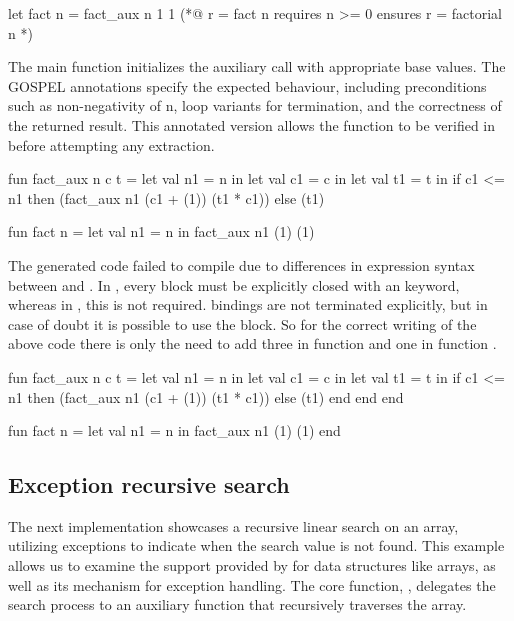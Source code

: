 \begin{gospell}
let fact n = fact_aux n 1 1
(*@ 
  r = fact n
  requires n >= 0 
  ensures r = factorial n
*)
\end{gospell}

The main function  initializes the auxiliary call with appropriate base values. The GOSPEL annotations 
specify the expected behaviour, including preconditions such as non-negativity of n, loop variants for termination, and the 
correctness of the returned result. This annotated version allows the function to be verified in \whythree before attempting any 
extraction.

\begin{cakeml}
fun fact_aux n c t = let val n1 = n in
  let val c1 = c in
  let val t1 = t in
  if c1 <= n1 then (fact_aux n1 (c1 + (1)) (t1 * c1))  else (t1)

fun fact n = let val n1 = n in fact_aux n1 (1) (1)
\end{cakeml}

The generated \cml code failed to compile due to differences in  expression syntax between \ocaml and \cml. In \cml, every 
 block must be explicitly closed with an  keyword, whereas in \ocaml, this is not required. 
 bindings are not terminated explicitly, but in case of doubt it is possible to use the  block. 
So for the correct writing of the above code there is only the need to add three  in function  and 
one  in function .

\begin{cakeml}
fun fact_aux n c t = let val n1 = n in
  let val c1 = c in
  let val t1 = t in
  if c1 <= n1 then (fact_aux n1 (c1 + (1)) (t1 * c1))  else (t1)
  end end end

fun fact n = let val n1 = n in fact_aux n1 (1) (1) end
\end{cakeml}

\subsection{Exception recursive search}

The next implementation showcases a recursive linear search on an array, utilizing exceptions to indicate when the search value 
is not found. This example allows us to examine the support provided by \ocaml for data structures like arrays, as well as its 
mechanism for exception handling. The core function, , delegates the search process to an auxiliary 
function that recursively traverses the array.

